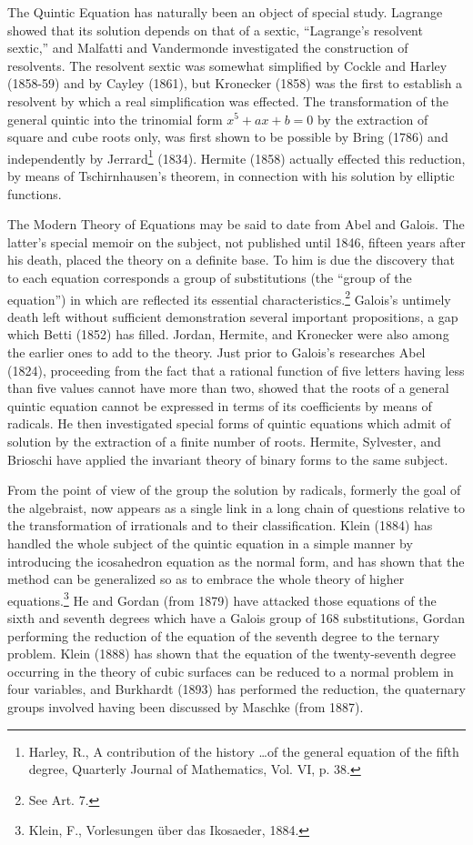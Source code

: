 \documentclass[oneside]{book}
\begin{document}
The Quintic Equation has naturally been an object of special
study. Lagrange showed that its solution depends on that of a
sextic, ``Lagrange's resolvent sextic,'' and Malfatti and
Vandermonde investigated the construction of resolvents. The
resolvent sextic was somewhat simplified by Cockle and Harley
(1858-59) and by Cayley (1861), but Kronecker (1858) was the first
to establish a resolvent by which a real simplification was
effected. The transformation of the general quintic into the
trinomial form $x^5+ax+b=0$ by the extraction of square and cube
roots only, was first shown to be possible by Bring (1786) and
independently by Jerrard\footnote{Harley, R., A contribution of
the history \ldots of the general equation of the fifth degree,
Quarterly Journal of Mathematics, Vol. VI, p. 38.} (1834). Hermite
(1858) actually effected this reduction, by means of Tschirnhausen's
theorem, in connection with his solution by elliptic functions.

The Modern Theory of Equations may be said to date from Abel and
Galois. The latter's special memoir on the subject, not published
until 1846, fifteen years after his death, placed the theory on a
definite base. To him is due the discovery that to each equation
corresponds a group of substitutions (the ``group of the equation'')
in which are reflected its essential characteristics.\footnote{See
Art. 7.} Galois's untimely death left without sufficient
demonstration several important propositions, a gap which Betti
(1852) has filled. Jordan, Hermite, and Kronecker were also among
the earlier ones to add to the theory. Just prior to Galois's
researches Abel (1824), proceeding from the fact that a rational
function of five letters having less than five values cannot have
more than two, showed that the roots of a general quintic equation
cannot be expressed in terms of its coefficients by means of
radicals. He then investigated special forms of quintic equations
which admit of solution by the extraction of a finite number of
roots. Hermite, Sylvester, and Brioschi have applied the invariant
theory of binary forms to the same subject.

From the point of view of the group the solution by radicals,
formerly the goal of the algebraist, now appears as a single link in
a long chain of questions relative to the transformation of
irrationals and to their classification. Klein (1884) has handled
the whole subject of the quintic equation in a simple manner by
introducing the icosahedron equation as the normal form, and has
shown that the method can be generalized so as to embrace the whole
theory of higher equations.\footnote{Klein, F., Vorlesungen \"uber
das Ikosaeder, 1884.} He and Gordan (from 1879) have attacked those
equations of the sixth and seventh degrees which have a Galois group
of 168 substitutions, Gordan performing the reduction of the
equation of the seventh degree to the ternary problem. Klein (1888)
has shown that the equation of the twenty-seventh degree occurring
in the theory of cubic surfaces can be reduced to a normal problem
in four variables, and Burkhardt (1893) has performed the reduction,
the quaternary groups involved having been discussed by Maschke
(from 1887).
\end{document}
